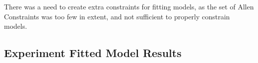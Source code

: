 





There was a need to create extra constraints for fitting models, as the set of Allen Constraints was too few in extent, and not sufficient to properly constrain models.

%






\subsection{Experiment Fitted Model Results} 


